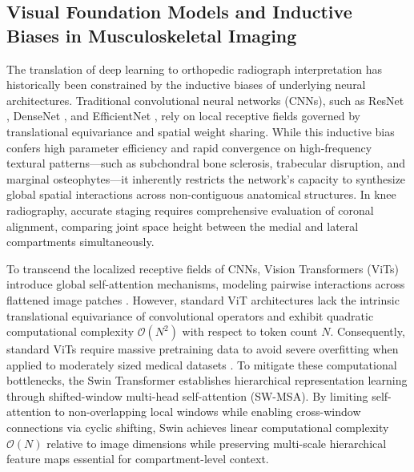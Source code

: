 \documentclass[10pt,journal]{IEEEtran}
\begin{document}
\subsection{Visual Foundation Models and Inductive Biases in Musculoskeletal Imaging}
\label{subsec:transformers_convnets}

The translation of deep learning to orthopedic radiograph interpretation has historically been constrained by the inductive biases of underlying neural architectures. Traditional convolutional neural networks (CNNs), such as ResNet \cite{he2016deep}, DenseNet \cite{huang2017densely}, and EfficientNet \cite{tan2019efficientnet}, rely on local receptive fields governed by translational equivariance and spatial weight sharing. While this inductive bias confers high parameter efficiency and rapid convergence on high-frequency textural patterns---such as subchondral bone sclerosis, trabecular disruption, and marginal osteophytes---it inherently restricts the network's capacity to synthesize global spatial interactions across non-contiguous anatomical structures. In knee radiography, accurate staging requires comprehensive evaluation of coronal alignment, comparing joint space height between the medial and lateral compartments simultaneously.

To transcend the localized receptive fields of CNNs, Vision Transformers (ViTs) introduce global self-attention mechanisms, modeling pairwise interactions across flattened image patches \cite{liu2021swin}. However, standard ViT architectures lack the intrinsic translational equivariance of convolutional operators and exhibit quadratic computational complexity $\mathcal{O}(N^2)$ with respect to token count $N$. Consequently, standard ViTs require massive pretraining data to avoid severe overfitting when applied to moderately sized medical datasets \cite{raghu2019transfusion, tajbakhsh2016convolutional}. To mitigate these computational bottlenecks, the Swin Transformer \cite{liu2021swin} establishes hierarchical representation learning through shifted-window multi-head self-attention (SW-MSA). By limiting self-attention to non-overlapping local windows while enabling cross-window connections via cyclic shifting, Swin achieves linear computational complexity $\mathcal{O}(N)$ relative to image dimensions while preserving multi-scale hierarchical feature maps essential for compartment-level context.
\end{document}
